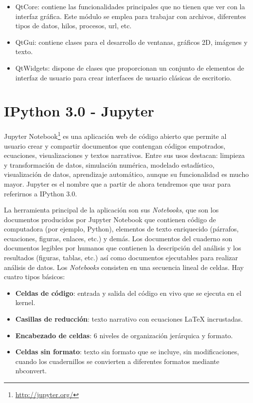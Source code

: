 \begin{itemize}
	\item QtCore: contiene las funcionalidades principales que no tienen que ver con la interfaz gráfica. Este módulo se emplea para trabajar con archivos, diferentes tipos de datos, hilos, procesos, url, etc.
	\item QtGui: contiene clases para el desarrollo de ventanas, gráficos 2D, imágenes y texto.
	\item QtWidgets: dispone de clases que proporcionan un conjunto de elementos de interfaz de usuario para crear interfaces de usuario clásicas de escritorio. 
\end{itemize}

\section{IPython 3.0 - Jupyter}
Jupyter Notebook\footnote{\url{http://jupyter.org/}} es una aplicación web de código abierto que permite al usuario crear y compartir documentos que contengan códigos empotrados, ecuaciones, visualizaciones y textos narrativos. Entre sus usos destacan: limpieza y transformación de datos, simulación numérica, modelado estadístico, visualización de datos, aprendizaje automático, aunque su funcionalidad es mucho mayor. Jupyter es el nombre que a partir de ahora tendremos que usar para referirnos a IPython 3.0.

La herramienta principal de la aplicación son sus \textit{Notebooks}, que son los documentos producidos por Jupyter Notebook que contienen código de computadora (por ejemplo, Python), elementos de texto enriquecido (párrafos, ecuaciones, figuras, enlaces, etc.) y demás. Los documentos del cuaderno son documentos legibles por humanos que contienen la descripción del análisis y los resultados (figuras, tablas, etc.) así como documentos ejecutables para realizar análisis de datos.
Los \textit{Notebooks} consisten en una secuencia lineal de celdas. Hay cuatro tipos básicos:

\begin{itemize}
	\item \textbf{Celdas de código}: entrada y salida del código en vivo que se ejecuta en el kernel. 
	\item \textbf{Casillas de reducción}: texto narrativo con ecuaciones LaTeX incrustadas.
	\item \textbf{Encabezado de celdas}: 6 niveles de organización jerárquica y formato.
	\item \textbf{Celdas sin formato}: texto sin formato que se incluye, sin modificaciones, cuando los cuadernillos se convierten a diferentes formatos mediante nbconvert.
\end{itemize}

